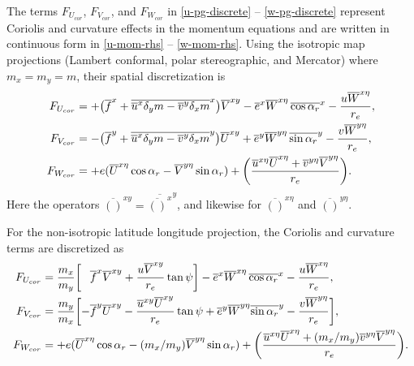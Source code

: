 The terms $F_{U_{cor}}$, $F_{V_{cor}}$, and $F_{W_{cor}}$ in 
\eqref{u-pg-discrete} -- \eqref{w-pg-discrete}
represent Coriolis and
curvature effects in the momentum equations and are written in continuous form in
\eqref{u-mom-rhs} -- \eqref{w-mom-rhs}. Using the isotropic map projections 
(Lambert conformal, polar stereographic, and Mercator) where $m_x=m_y=m$,
 their spatial discretization is
%
\begin{align}
F_{U_{cor}} & =  + 
\bigl({\overline f}^x +
{\overline{
  {\overline u}^x 
   {\delta_y m} 
- {\overline v}^y 
    \delta_x m}}^x     \bigr)
{\overline V}^{xy}
- {\overline e}^x
{\overline W}^{x\eta}\, {\overline{\cos \alpha_r}}^x 
- {u {\overline W}^{x\eta} \over r_e},
\label{coriolis-u-regional}
\\
%
F_{V_{cor}} & =  - 
\bigl({\overline f}^y +
{\overline{
{\overline u}^x 
{\delta_y m} 
- {\overline v}^y \delta_x m}}^y \bigr)
{\overline U}^{xy}
+ {\overline e}^y
{\overline W}^{y\eta}\, {\overline{\sin \alpha_r}}^y 
- {v {\overline W}^{y\eta} \over r_e},
\label{coriolis-v-regional}
\\
%
F_{W_{cor}} & = + e ({\overline U}^{x\eta}
\cos \alpha_r - {\overline V}^{y\eta}
\sin \alpha_r) + \biggl({ 
 {\overline u}^{x\eta}  {\overline U}^{x\eta} 
+{\overline v}^{y\eta}  {\overline V}^{y\eta} 
\over r_e}\biggr).
\label{coriolis-w-regional}
\end{align}
%
\noindent
Here the operators $\overline{()}^{xy} = \overline{\overline{()}^{x}}^y
$, and likewise for $\overline{()}^{x\eta}$ and $\overline{()}^{y\eta}$.

For the non-isotropic latitude longitude projection, the Coriolis and
curvature terms are discretized as
%
\begin{align}
F_{U_{cor}} & =  {m_x \over m_y} \biggl[\hphantom{-}{\overline f}^x 
{\overline V}^{xy}
+ {u\overline{V}^{xy} \over r_e} \tan\psi \biggr] 
- {\overline e}^x
{\overline W}^{x\eta}\, {\overline{\cos \alpha_r}}^x 
- {u {\overline W}^{x\eta} \over r_e},
\label{coriolis-u-global}
\\
%
F_{V_{cor}} & =  {m_y \over m_x} \biggl[ - \overline{f}^y
\overline{U}^{xy} 
- {\overline{u}^{xy} \overline{U}^{xy} \over r_e} \tan \psi  
+ \overline{e}^y \overline{W}^{y\eta}\overline{\sin \alpha_r}^y
- {v\overline{W}^{y\eta} \over r_e}
\biggr],
\label{coriolis-v-global}
\\
%
F_{W_{cor}} & = + e ({\overline U}^{x\eta}
\cos \alpha_r - (m_x/m_y) {\overline V}^{y\eta}
\sin \alpha_r) + \biggl({ 
 {\overline u}^{x\eta}  {\overline U}^{x\eta} 
+(m_x/m_y) {\overline v}^{y\eta}  {\overline V}^{y\eta} 
\over r_e}\biggr).
\label{coriolis-w-global}
%
\end{align}



